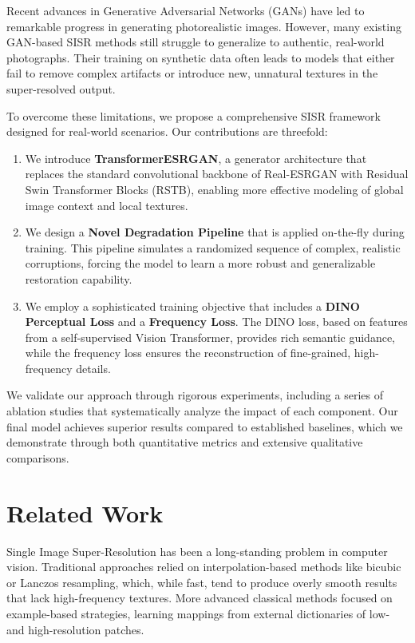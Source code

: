 \documentclass{article}
\begin{document}
Recent advances in Generative Adversarial Networks (GANs) have led to remarkable progress in generating photorealistic images. However, many existing GAN-based SISR methods still struggle to generalize to authentic, real-world photographs. Their training on synthetic data often leads to models that either fail to remove complex artifacts or introduce new, unnatural textures in the super-resolved output.

To overcome these limitations, we propose a comprehensive SISR framework designed for real-world scenarios. Our contributions are threefold:
\begin{enumerate}
    \item We introduce \textbf{TransformerESRGAN}, a generator architecture that replaces the standard convolutional backbone of Real-ESRGAN with Residual Swin Transformer Blocks (RSTB), enabling more effective modeling of global image context and local textures.
    \item We design a \textbf{Novel Degradation Pipeline} that is applied on-the-fly during training. This pipeline simulates a randomized sequence of complex, realistic corruptions, forcing the model to learn a more robust and generalizable restoration capability.
    \item We employ a sophisticated training objective that includes a \textbf{DINO Perceptual Loss} and a \textbf{Frequency Loss}. The DINO loss, based on features from a self-supervised Vision Transformer, provides rich semantic guidance, while the frequency loss ensures the reconstruction of fine-grained, high-frequency details.
\end{enumerate}
We validate our approach through rigorous experiments, including a series of ablation studies that systematically analyze the impact of each component. Our final model achieves superior results compared to established baselines, which we demonstrate through both quantitative metrics and extensive qualitative comparisons.

\section{Related Work}
Single Image Super-Resolution has been a long-standing problem in computer vision. Traditional approaches relied on interpolation-based methods like bicubic or Lanczos resampling, which, while fast, tend to produce overly smooth results that lack high-frequency textures. More advanced classical methods focused on example-based strategies, learning mappings from external dictionaries of low- and high-resolution patches.
\end{document}
